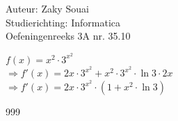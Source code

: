 \documentclass[a4paper]{article}
\begin{document}
  
\noindent \large Auteur: Zaky Souai \\
\noindent \large Studierichting:  Informatica\\
\noindent \large Oefeningenreeks 3A nr. 35.10\\

\bigskip

\normalsize

$f(x) = x^2 \cdot 3^{x^2}$ \\

$\Rightarrow f'(x) = 2x \cdot 3^{x^2} + x^2 \cdot 3^{x^2} \cdot \ln 3 \cdot 2x$ \\

$\Rightarrow f'(x) = 2x \cdot 3^{x^2} \cdot (1 + x^2 \cdot \ln 3 )$ \\



\begin{thebibliography}{999}
\end{thebibliography}
\end{document}
